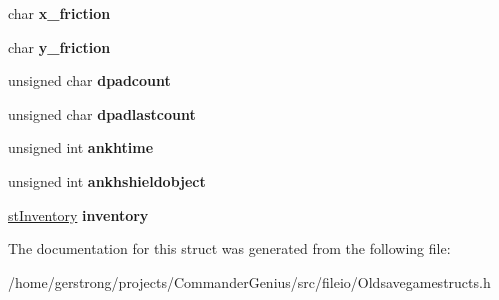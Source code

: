 \begin{DoxyCompactItemize}
\item 
\hypertarget{struct_old_save_game_format_1_1st_player_a2e7eaaec86a95c642c4443e786024044}{
char {\bfseries x\_\-friction}}
\label{struct_old_save_game_format_1_1st_player_a2e7eaaec86a95c642c4443e786024044}

\item 
\hypertarget{struct_old_save_game_format_1_1st_player_a0db3e7f009b4b3525ced23003a2d0a8e}{
char {\bfseries y\_\-friction}}
\label{struct_old_save_game_format_1_1st_player_a0db3e7f009b4b3525ced23003a2d0a8e}

\item 
\hypertarget{struct_old_save_game_format_1_1st_player_a1951dc033444cb25a2c9b4863ebde521}{
unsigned char {\bfseries dpadcount}}
\label{struct_old_save_game_format_1_1st_player_a1951dc033444cb25a2c9b4863ebde521}

\item 
\hypertarget{struct_old_save_game_format_1_1st_player_a82c65bdacf5ebb2d755684b61ef2c4c6}{
unsigned char {\bfseries dpadlastcount}}
\label{struct_old_save_game_format_1_1st_player_a82c65bdacf5ebb2d755684b61ef2c4c6}

\item 
\hypertarget{struct_old_save_game_format_1_1st_player_afd479705924e999a6b7c1c196da08b39}{
unsigned int {\bfseries ankhtime}}
\label{struct_old_save_game_format_1_1st_player_afd479705924e999a6b7c1c196da08b39}

\item 
\hypertarget{struct_old_save_game_format_1_1st_player_ac77e75641120c13c9d7f68a36fe5f7a3}{
unsigned int {\bfseries ankhshieldobject}}
\label{struct_old_save_game_format_1_1st_player_ac77e75641120c13c9d7f68a36fe5f7a3}

\item 
\hypertarget{struct_old_save_game_format_1_1st_player_a7b03e09db98cb7fbbe446fe0e4d06704}{
\hyperlink{structst_inventory}{stInventory} {\bfseries inventory}}
\label{struct_old_save_game_format_1_1st_player_a7b03e09db98cb7fbbe446fe0e4d06704}

\end{DoxyCompactItemize}


The documentation for this struct was generated from the following file:\begin{DoxyCompactItemize}
\item 
/home/gerstrong/projects/CommanderGenius/src/fileio/Oldsavegamestructs.h\end{DoxyCompactItemize}
